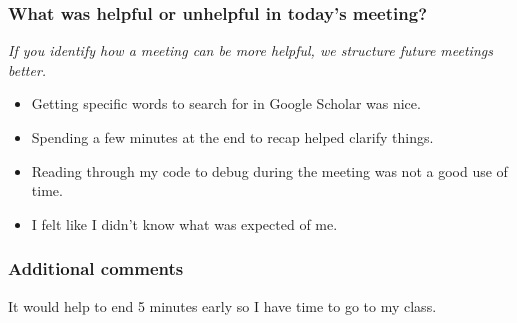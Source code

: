 \documentclass[10pt, letter]{article}
\begin{document}
\subsubsection*{What was helpful or unhelpful in today's meeting?}

\textit{If you identify how a meeting can be more helpful, we structure future meetings better.}

\begin{note}
\begin{itemize}
\item Getting specific words to search for in Google Scholar was nice.
\item Spending a few minutes at the end to recap helped clarify things.
\item Reading through my code to debug during the meeting was not a good use of time.
\item I felt like I didn't know what was expected of me.
\end{itemize}
\end{note}


\subsubsection*{Additional comments}

\begin{note}
It would help to end 5 minutes early so I have time to go to my class.
\end{note}
\end{document}
